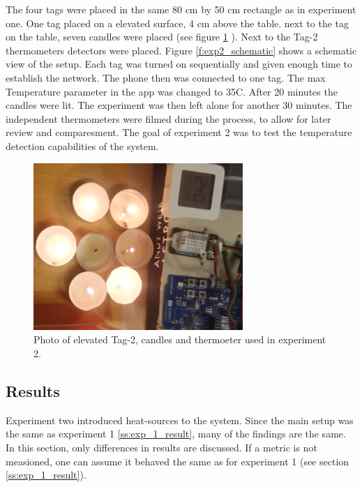 The four tags were placed in the same 80 cm by 50 cm rectangle as in experiment one.
One tag placed on a elevated surface, 4 cm above the table.
next to the tag on the table, seven candles were placed (see figure \ref{f:exp2_photo} ).
Next to the Tag-2 thermometers detectors were placed.
Figure \ref{f:exp2_schematic} shows a schematic view of the setup.
Each tag was turned on sequentially and given enough time to establish the network.
The phone then was connected to one tag.
The max Temperature parameter in the app was changed to 35\degree C.
After 20 minutes the candles were lit.
The experiment was then left alone for another 30 minutes.
The independent thermometers were filmed during the process, to allow for later review and comparesment.
The goal of experiment 2 was to test the temperature detection capabilities of the system.

\begin{figure}[ht!]
	\centering
	\includegraphics[width=300px]{graphics/exp/Exp_2_photo.png}
	\caption{Photo of elevated Tag-2, candles and thermoeter used in experiment 2.}
	\label{f:exp2_photo}
\end{figure}


\subsection{Results}
\label{ss:exp_2_result}
Experiment two introduced heat-sources to the system.
Since the main setup was the same as experiment 1 \ref{ss:exp_1_result}, many of the findings are the same.
In this section, only differences in results are discussed.
If a metric is not measioned, one can assume it behaved the same as for experiment 1  (see section \ref{ss:exp_1_result}).

